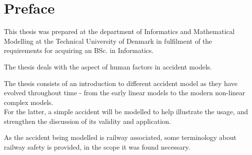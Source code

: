 \chapter{Preface}

This thesis was prepared at the department of Informatics and Mathematical Modelling at the Technical University of Denmark in fulfilment of the requirements for acquiring an BSc. in Informatics. 

The thesis deals with the aspect of human factors in accident models.

The thesis consists of an introduction to different accident model as they have evolved throughout time - from the early linear models to the modern non-linear complex models.\\
For the latter, a simple accident will be modelled to help illustrate the usage, and strengthen the discussion of its validity and application.

As the accident being modelled is railway associated, some terminology about railway safety is provided, in the scope it was found necessary.

